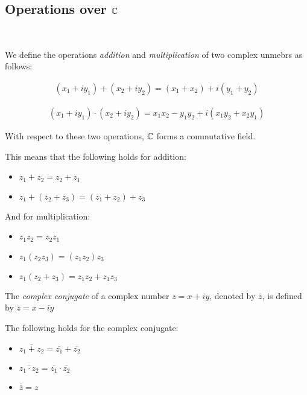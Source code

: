\subsection{Operations over $\mathbb{C}$}\hfill\\\par
\noindent We define the operations \textit{addition} and \textit{multiplication} of two complex unmebrs as follows:
\par\bigskip
\begin{theo}{}
  \begin{equation*}
    \begin{gathered}
      (x_1+iy_1)+(x_2+iy_2) = (x_1+x_2)+i(y_1+y_2)
    \end{gathered}
  \end{equation*}
\end{theo}
\par\bigskip
\begin{theo}{}
  \begin{equation*}
    \begin{gathered}
      (x_1+iy_1)\cdot(x_2+iy_2) = x_1x_2-y_1y_2+i(x_1y_2+x_2y_1)
    \end{gathered}
  \end{equation*}
\end{theo}
\par\bigskip
\noindent With respect to these two operations, $\mathbb{C}$ forms a commutative field.
\par\bigskip
\noindent This means that the following holds for addition:\par
\begin{itemize}
  \item $z_1+z_2 = z_2+z_1$
  \item $z_1+(z_2+z_3) = (z_1+z_2) + z_3$
\end{itemize}
\par\bigskip
\noindent And for multiplication:\par
\begin{itemize}
  \item $z_1z_2 = z_2z_1$
  \item $z_1(z_2z_3) = (z_1z_2)z_3$
  \item $z_1(z_2+z_3) = z_1z_2+z_1z_3$
\end{itemize}
\par\bigskip
\begin{theo}{}
  The \textit{complex conjugate} of a complex number $z = x+iy$, denoted by $\overline{z}$, is defined by $\overline{z} = x-iy$
  \par\bigskip
  \noindent The following holds for the complex conjugate:\par
  \begin{itemize}
    \item $\overline{z_1+z_2} = \overline{z_1}+\overline{z_2}$
    \item $\overline{z_1\cdot z_2} = \overline{z_1}\cdot\overline{z_2}$
    \item $\overline{\overline{z}} = z$
  \end{itemize}
\end{theo}
